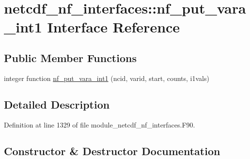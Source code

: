 \hypertarget{interfacenetcdf__nf__interfaces_1_1nf__put__vara__int1}{}\section{netcdf\+\_\+nf\+\_\+interfaces\+:\+:nf\+\_\+put\+\_\+vara\+\_\+int1 Interface Reference}
\label{interfacenetcdf__nf__interfaces_1_1nf__put__vara__int1}
\subsection*{Public Member Functions}
\begin{DoxyCompactItemize}
\item 
integer function \hyperlink{interfacenetcdf__nf__interfaces_1_1nf__put__vara__int1_a92f3e9d86942ea75bd95f60ea33f12c2}{nf\+\_\+put\+\_\+vara\+\_\+int1} (ncid, varid, start, counts, i1vals)
\end{DoxyCompactItemize}


\subsection{Detailed Description}


Definition at line 1329 of file module\+\_\+netcdf\+\_\+nf\+\_\+interfaces.\+F90.



\subsection{Constructor \& Destructor Documentation}
\mbox{\label{interfacenetcdf__nf__interfaces_1_1nf__put__vara__int1_a92f3e9d86942ea75bd95f60ea33f12c2}} 
